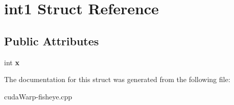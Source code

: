 \hypertarget{structint1}{}\section{int1 Struct Reference}
\label{structint1}
\subsection*{Public Attributes}
\begin{DoxyCompactItemize}
\item 
int {\bfseries x}\hypertarget{structint1_a2d1f4bf501f3332b7d1665316720c689}{}\label{structint1_a2d1f4bf501f3332b7d1665316720c689}

\end{DoxyCompactItemize}


The documentation for this struct was generated from the following file\+:\begin{DoxyCompactItemize}
\item 
cuda\+Warp-\/fisheye.\+cpp\end{DoxyCompactItemize}
